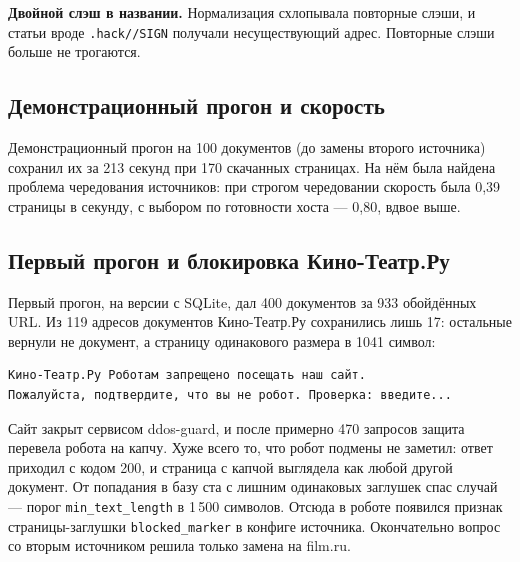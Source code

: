 \textbf{Двойной слэш в названии.} Нормализация схлопывала повторные слэши, и
статьи вроде \texttt{.hack//SIGN} получали несуществующий адрес. Повторные слэши
больше не трогаются.

\subsection*{Демонстрационный прогон и скорость}

Демонстрационный прогон на 100 документов (до замены второго источника) сохранил
их за 213 секунд при 170 скачанных страницах. На нём была найдена проблема
чередования источников: при строгом чередовании скорость была 0,39 страницы в
секунду, с выбором по готовности хоста --- 0,80, вдвое выше.

\subsection*{Первый прогон и блокировка Кино-Театр.Ру}

Первый прогон, на версии с SQLite, дал 400 документов за 933 обойдённых URL.
Из 119 адресов документов Кино-Театр.Ру сохранились лишь 17: остальные вернули
не документ, а страницу одинакового размера в 1041 символ:

\begin{verbatim}
Кино-Театр.Ру Роботам запрещено посещать наш сайт.
Пожалуйста, подтвердите, что вы не робот. Проверка: введите...
\end{verbatim}

Сайт закрыт сервисом ddos-guard, и после примерно 470 запросов защита перевела
робота на капчу. Хуже всего то, что робот подмены не заметил: ответ приходил с
кодом 200, и страница с капчой выглядела как любой другой документ. От попадания
в базу ста с лишним одинаковых заглушек спас случай --- порог
\texttt{min\_text\_length} в 1\,500 символов. Отсюда в роботе появился признак
страницы-заглушки \texttt{blocked\_marker} в конфиге источника. Окончательно
вопрос со вторым источником решила только замена на film.ru.

\pagebreak
